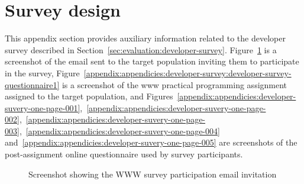 \section{Survey design \label{ch:appendex-b:developer-survey:questionnaire-design}}

This appendix section provides auxiliary information related to the developer survey described in Section~\ref{sec:evaluation:developer-survey}. Figure~\ref{appendix:appendicies:developer-survey:WWW-survey-research-link} is a screenshot of the email sent to the target population inviting them to participate in the survey, Figure~\ref{appendix:appendicies:developer-survey:developer-survey-questionnaire1} is a screenshot of the \gls{www} practical programming assignment assigned to the target population, and Figures~\ref{appendix:appendicies:developer-suvery-one-page-001},~\ref{appendix:appendicies:developer-suvery-one-page-002},~\ref{appendix:appendicies:developer-suvery-one-page-003},~\ref{appendix:appendicies:developer-suvery-one-page-004} and~\ref{appendix:appendicies:developer-suvery-one-page-005} are screenshots of the post-assignment online questionnaire used by survey participants.

\begin{figure}
 \centering
 \caption[Screenshot showing the survey participation email invitation]{Screenshot showing the WWW survey participation email invitation}
 \label{appendix:appendicies:developer-survey:WWW-survey-research-link}
\end{figure}

